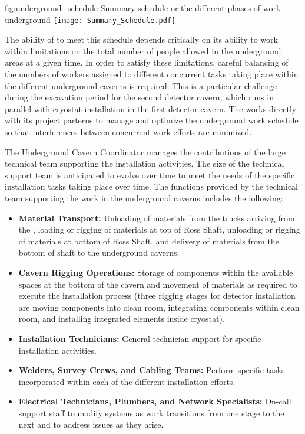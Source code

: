 \begin{dunefigure}{fig:underground_schedule}
  {Summary schedule or the different phases of work underground}
  \texttt{[image: Summary\_Schedule.pdf]}
\end{dunefigure}

The ability of  to meet this schedule depends 
critically on its ability to work within limitations on the total
number of people allowed in the underground areas at a given time.
In order to satisfy these limitations, careful balancing of the 
numbers of workers assigned to different concurrent tasks taking 
place within the different underground caverns is required.  
This is a particular challenge during the excavation period for 
the second detector cavern, which runs in parallel with cryostat
installation in the first detector cavern.  The  works 
directly with its  project parterns to manage 
and optimize the underground work schedule so that interferences 
between concurrent work efforts are minimized.

The Underground Cavern Coordinator manages the contributions of 
the large technical team supporting the installation activities.
The size of the technical support team is anticipated to evolve  
over time to meet the needs of the specific installation tasks 
taking place over time.  The functions provided by the technical 
team supporting the work in the underground caverns includes the
following:

\begin{itemize}
  \item {\bf Material Transport:} Unloading of materials from the 
        trucks arriving from the , loading or rigging 
        of materials at top of Ross Shaft, unloading or rigging 
        of materials at bottom of Ross Shaft, and delivery of 
        materials from the bottom of shaft to the underground 
        caverns.        
  \item {\bf Cavern Rigging Operations:}  Storage of 
        components within the available spaces at the bottom 
        of the cavern and movement of materials as required to 
        execute the installation process (three rigging stages
        for detector installation are moving components into 
        clean room, integrating components within clean room, 
        and installing integrated elements inside cryostat).
  \item {\bf Installation Technicians:}  General technician 
        support for specific installation activities. 
  \item {\bf Welders, Survey Crews, and Cabling Teams:}  Perform 
        specific tasks incorporated within each of the different 
        installation efforts.
  \item {\bf Electrical Technicians, Plumbers, and Network 
        Specialists:}  On-call support staff to modify systems 
        as work transitions from one stage to the next and to 
        address issues as they arise.             
\end{itemize}   
    

